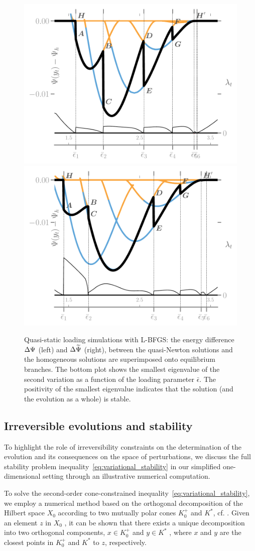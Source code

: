 \documentclass[10pt]{article}
\begin{document}
\begin{figure}
    \hspace*{-.3cm}
    \includegraphics[width=.5\textwidth]{../images/model_stiff_energy_kick_algo.pdf} 
    \includegraphics[width=.5\textwidth]{../images/model_compliant_energy_kick_algo.pdf}
    \caption{
        Quasi-static loading simulations with L-BFGS: the energy difference $\Delta \Psi$ (left) and $\Delta\widetilde\Psi$ (right), between the quasi-Newton solutions and the homogeneous solutions are superimposed onto equilibrium branches. The bottom plot shows the smallest eigenvalue of the second variation as a function of the loading parameter $\bar\epsilon$. The positivity of the smallest eigenvalue indicates that the solution (and the evolution as a whole) is stable.
        }
    \label{fig:tempostable}
\end{figure}


\subsection{Irreversible evolutions and stability}
To highlight the role of irreversibility constraints on the determination of the evolution and its consequences on the space of perturbations, we discuss the full stability problem inequality~\eqref{eq:variational_stability} in our simplified one-dimensional setting through an illustrative numerical computation. 

To solve the second-order cone-constrained inequality~\eqref{eq:variational_stability}, we employ a numerical method based on the orthogonal decomposition of the Hilbert space  $X_0$  according to two mutually polar cones  $K^+_0$  and  $K^*$, cf. \cite{Moreau1962-fz}. Given an element  $z$  in  $X_0$ , it can be shown that there exists a unique decomposition into two orthogonal components,  $x \in K^+_0$  and  $y \in K^*$ , where  $x$  and  $y$  are the closest points in  $K^+_0$  and  $K^*$  to  $z$, respectively.
\end{document}
